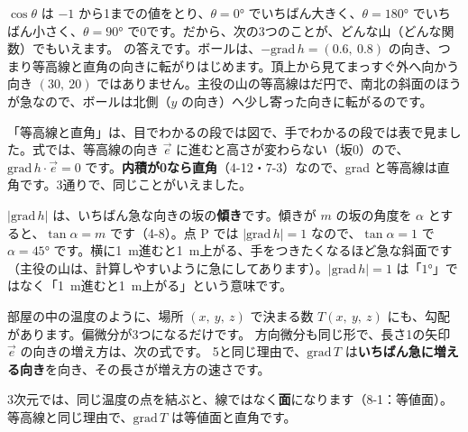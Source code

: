 $\cos\theta$ は $-1$ から1までの値をとり、$\theta=0°$ でいちばん大きく、$\theta=180°$ でいちばん小さく、$\theta=90°$ で0です。だから、次の3つのことが、どんな山（どんな関数）でもいえます。
\bkhatenaref の答えです。ボールは、$-\mathrm{grad}\,h=(0.6,\ 0.8)$ の向き、つまり等高線と直角の向きに転がりはじめます。頂上から見てまっすぐ外へ向かう向き $(30,\ 20)$ ではありません。主役の山の等高線はだ円で、南北の斜面のほうが急なので、ボールは北側（$y$ の向き）へ少し寄った向きに転がるのです。

\noindent 「等高線と直角」は、目でわかるの段では図で、手でわかるの段では表で見ました。式では、等高線の向き $\vec e$ に進むと高さが変わらない（坂0）ので、$\mathrm{grad}\,h\cdot\vec e=0$ です。\textbf{内積が0なら直角}（4-12・7-3）なので、grad と等高線は直角です。3通りで、同じことがいえました。

$|\mathrm{grad}\,h|$ は、いちばん急な向きの坂の\textbf{傾き}です。傾きが $m$ の坂の角度を $\alpha$ とすると、$\tan\alpha=m$ です（4-8）。点 P では $|\mathrm{grad}\,h|=1$ なので、$\tan\alpha=1$ で $\alpha=45°$ です。横に\qty{1}{m}進むと\qty{1}{m}上がる、手をつきたくなるほど急な斜面です（主役の山は、計算しやすいように急にしてあります）。$|\mathrm{grad}\,h|=1$ は「$1°$」ではなく「\qty{1}{m}進むと\qty{1}{m}上がる」という意味です。


\leavevmode\label{bk:8-4:3d}部屋の中の温度のように、場所 $(x,\ y,\ z)$ で決まる数 $T(x,\ y,\ z)$ にも、勾配があります。偏微分が3つになるだけです。
方向微分も同じ形で、長さ1の矢印 $\vec e$ の向きの増え方は、次の式です。
5と同じ理由で、$\mathrm{grad}\,T$ は\textbf{いちばん急に増える向き}を向き、その長さが増え方の速さです。

\noindent 3次元では、同じ温度の点を結ぶと、線ではなく\textbf{面}になります（8-1：等値面）。等高線と同じ理由で、$\mathrm{grad}\,T$ は等値面と直角です。

